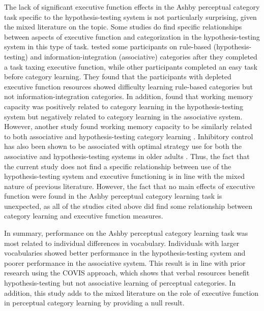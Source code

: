 \documentclass[../dissertation.tex]{subfiles}
\begin{document}
	The lack of significant executive function effects in the Ashby perceptual category task specific to the hypothesis-testing system is not particularly surprising, given the mixed literature on the topic. Some studies do find specific relationships between aspects of executive function and categorization in the hypothesis-testing system in this type of task. \citet{Minda2015} tested some participants on rule-based (hypothesis-testing) and information-integration (associative) categories after they completed a task taxing executive function, while other participants completed an easy task before category learning. They found that the participants with depleted executive function resources showed difficulty learning rule-based categories but not information-integration categories. In addition, \citet{DeCaro2008} found that working memory capacity was positively related to category learning in the hypothesis-testing system but negatively related to category learning in the associative system. However, another study found working memory capacity to be similarly related to both associative and hypothesis-testing category learning \citep{Lewandowsky2012}. Inhibitory control has also been shown to be associated with optimal strategy use for both the associative and hypothesis-testing systems in older adults \citep{Maddox2010}. Thus, the fact that the current study does not find a specific relationship between use of the hypothesis-testing system and executive functioning is in line with the mixed nature of previous literature. However, the fact that no main effects of executive function were found in the Ashby perceptual category learning task is unexpected, as all of the studies cited above did find some relationship between category learning and executive function measures.  \par
	In summary, performance on the Ashby perceptual category learning task was most related to individual differences in vocabulary. Individuals with larger vocabularies showed better performance in the hypothesis-testing system and poorer performance in the associative system. This result is in line with prior research using the COVIS approach, which shows that verbal resources benefit hypothesis-testing but not associative learning of perceptual categories. In addition, this study adds to the mixed literature on the role of executive function in perceptual category learning by providing a null result.
	
\end{document}
